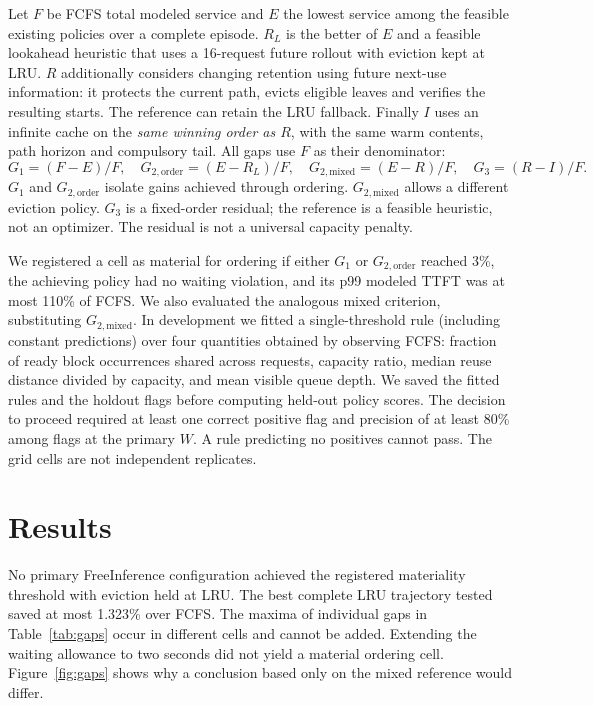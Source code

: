 \documentclass[11pt,letterpaper]{article}
\begin{document}
Let \(F\) be FCFS total modeled service and \(E\) the lowest service among the feasible existing policies over a complete episode. \(R_L\) is the better of \(E\) and a feasible lookahead heuristic that uses a 16-request future rollout with eviction kept at LRU. \(R\) additionally considers changing retention using future next-use information: it protects the current path, evicts eligible leaves and verifies the resulting starts. The reference can retain the LRU fallback. Finally \(I\) uses an infinite cache on the \emph{same winning order as \(R\)}, with the same warm contents, path horizon and compulsory tail. All gaps use \(F\) as their denominator:
\[
 G_1=(F-E)/F,\quad G_{2,\mathrm{order}}=(E-R_L)/F,\quad
 G_{2,\mathrm{mixed}}=(E-R)/F,\quad G_3=(R-I)/F .
\]
\(G_1\) and \(G_{2,\mathrm{order}}\) isolate gains achieved through ordering. \(G_{2,\mathrm{mixed}}\) allows a different eviction policy. \(G_3\) is a fixed-order residual; the reference is a feasible heuristic, not an optimizer. The residual is not a universal capacity penalty.

We registered a cell as material for ordering if either \(G_1\) or \(G_{2,\mathrm{order}}\) reached 3\%, the achieving policy had no waiting violation, and its p99 modeled TTFT was at most 110\% of FCFS. We also evaluated the analogous mixed criterion, substituting \(G_{2,\mathrm{mixed}}\). In development we fitted a single-threshold rule (including constant predictions) over four quantities obtained by observing FCFS: fraction of ready block occurrences shared across requests, capacity ratio, median reuse distance divided by capacity, and mean visible queue depth. We saved the fitted rules and the holdout flags before computing held-out policy scores. The decision to proceed required at least one correct positive flag and precision of at least 80\% among flags at the primary \(W\). A rule predicting no positives cannot pass. The grid cells are not independent replicates.

\section{Results}
No primary FreeInference configuration achieved the registered materiality threshold with eviction held at LRU. The best complete LRU trajectory tested saved at most 1.323\% over FCFS. The maxima of individual gaps in Table~\ref{tab:gaps} occur in different cells and cannot be added. Extending the waiting allowance to two seconds did not yield a material ordering cell. Figure~\ref{fig:gaps} shows why a conclusion based only on the mixed reference would differ.
\end{document}
